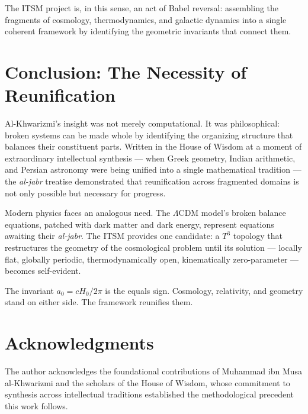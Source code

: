 \documentclass[aps,prd,11pt,onecolumn,superscriptaddress,nofootinbib,floatfix]{revtex4-2}
\begin{document}
The ITSM project is, in this sense, an act of Babel reversal: assembling the fragments of cosmology, thermodynamics, and galactic dynamics into a single coherent framework by identifying the geometric invariants that connect them.

\section{Conclusion: The Necessity of Reunification}
\label{sec:conclusion}

Al-Khwarizmi's insight was not merely computational. It was philosophical: broken systems can be made whole by identifying the organizing structure that balances their constituent parts. Written in the House of Wisdom at a moment of extraordinary intellectual synthesis --- when Greek geometry, Indian arithmetic, and Persian astronomy were being unified into a single mathematical tradition --- the \textit{al-jabr} treatise demonstrated that reunification across fragmented domains is not only possible but necessary for progress.

Modern physics faces an analogous need. The $\Lambda$CDM model's broken balance equations, patched with dark matter and dark energy, represent equations awaiting their \textit{al-jabr}. The ITSM provides one candidate: a $T^3$ topology that restructures the geometry of the cosmological problem until its solution --- locally flat, globally periodic, thermodynamically open, kinematically zero-parameter --- becomes self-evident.

The invariant $a_0 = cH_0/2\pi$ is the equals sign. Cosmology, relativity, and geometry stand on either side. The framework reunifies them.

\section*{Acknowledgments}
The author acknowledges the foundational contributions of Muhammad ibn Musa al-Khwarizmi and the scholars of the House of Wisdom, whose commitment to synthesis across intellectual traditions established the methodological precedent this work follows.
\end{document}
